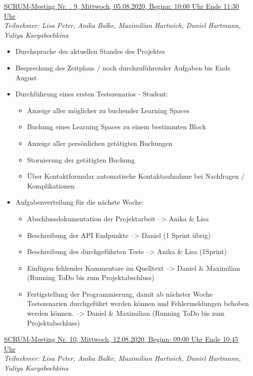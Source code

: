 \documentclass[a4paper,report,headsepline]{scrreprt}
\begin{document}
 \underline{{\large SCRUM-Meeting Nr. . 9, Mittwoch, 05.08.2020, Beginn: 10:00 Uhr Ende 11:30 Uhr}}  \\
\textit{Teilnehmer: Lisa Peter, Anika Balke, Maximilian Hartwich, Daniel Hartmann, Yuliya Karyabochkina}
\begin{itemize}
\item Durchsprache des aktuellen Standes des Projektes
\item Besprechung des Zeitplans / noch durchzuführender Aufgaben bis Ende August
\item Durchführung eines ersten Testszenarios - Student: 
\begin{itemize}
\item Anzeige aller möglicher zu buchender Learning Spaces
\item Buchung eines Learning Spaces zu einem bestimmten Block
\item Anzeige aller persönlichen getätigten Buchungen
\item Stornierung der getätigten Buchung
\item Über Kontaktformular automatische Kontaktaufnahme bei Nachfragen / Komplikationen
\end{itemize}
\item Aufgabenverteilung für die nächste Woche:
\begin{itemize}
\item Abschlussdokumentation der Projektarbeit --> Anika \& Lisa
\item Beschreibung der API Endpunkte --> Daniel (1 Sprint übrig)
\item Beschreibung des durchgeführten Tests --> Anika \& Lisa (1Sprint)
\item Einfügen fehlender Kommentare im Quelltext --> Daniel \& Maximilian (Running ToDo bis zum Projektabschluss)
\item Fertigstellung der Programmierung, damit ab nächster Woche Testszenarien durchgeführt werden können und Fehlermeldungen behoben werden können. --> Daniel \& Maximilian (Running ToDo bis zum Projektabschluss)

\end{itemize}
\end{itemize}
 \underline{{\large SCRUM-Meeting Nr. 10, Mittwoch, 12.08.2020, Beginn: 09:00 Uhr Ende 10:45 Uhr}}  \\
\textit{Teilnehmer: Lisa Peter, Anika Balke, Maximilian Hartwich, Daniel Hartmann, Yuliya Karyabochkina}
\end{document}
